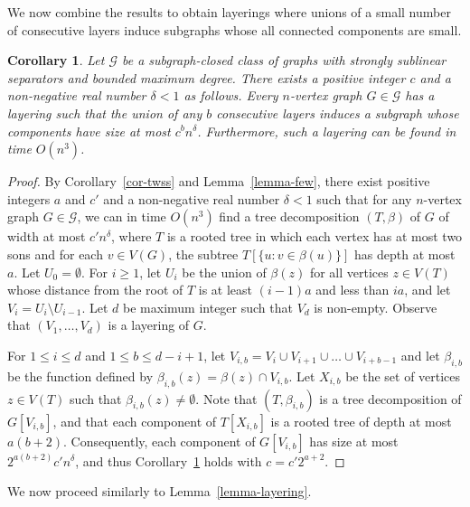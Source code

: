 \documentclass[a4paper,11pt]{article}
\newcommand{\GG}{{\mathcal G}}
\newtheorem{corollary}[theorem]{Corollary}
\begin{document}
We now combine the results to obtain layerings where unions of a small number of consecutive layers
induce subgraphs whose all connected components are small.

\begin{corollary}\label{cor-dglayering}
Let $\GG$ be a subgraph-closed class of graphs with strongly sublinear separators and bounded maximum degree.
There exists a positive integer $c$ and a non-negative real number $\delta<1$ as follows.
Every $n$-vertex graph $G\in \GG$ has a layering such that the union of any $b$ consecutive
layers induces a subgraph whose components have size at most $c^bn^\delta$.  Furthermore, such a layering
can be found in time $O(n^3)$.
\end{corollary}
\begin{proof}
By Corollary~\ref{cor-twss} and Lemma~\ref{lemma-few}, there exist positive integers $a$ and $c'$ and a non-negative real number $\delta<1$
such that for any $n$-vertex graph $G\in\GG$, we can in time $O(n^3)$ find a tree decomposition $(T,\beta)$ of $G$ of width at most $c'n^\delta$,
where $T$ is a rooted tree in which each vertex has at most two sons and for each $v\in V(G)$, the subtree $T[\{u:v\in \beta(u)\}]$ has depth at most $a$.
Let $U_0=\emptyset$.
For $i\ge 1$, let $U_i$ be the union of $\beta(z)$ for all vertices $z\in V(T)$ whose distance from the root of $T$ is at least $(i-1)a$ and less than $ia$,
and let $V_i=U_i\setminus U_{i-1}$.  Let $d$ be maximum integer such that $V_d$ is non-empty.  Observe that $(V_1,\ldots,V_d)$ is a layering of $G$.

For $1\le i\le d$ and $1\le b\le d-i+1$, let $V_{i,b}=V_i\cup V_{i+1}\cup \ldots\cup V_{i+b-1}$ and let $\beta_{i,b}$ be the function defined by $\beta_{i,b}(z)=\beta(z)\cap V_{i,b}$.
Let $X_{i,b}$ be the set of vertices $z\in V(T)$ such that $\beta_{i,b}(z)\neq\emptyset$.  Note that $(T,\beta_{i,b})$ is a tree decomposition of $G[V_{i,b}]$,
and that each component of $T[X_{i,b}]$ is a rooted tree of depth at most $a(b+2)$.  Consequently, each component of $G[V_{i,b}]$ has size at most
$2^{a(b+2)}c'n^\delta$, and thus Corollary~\ref{cor-dglayering} holds with $c=c'2^{a+2}$.
\end{proof}

We now proceed similarly to Lemma~\ref{lemma-layering}.
\end{document}
